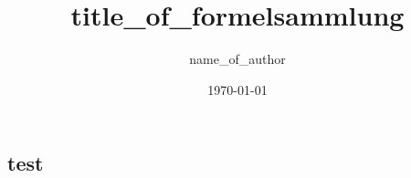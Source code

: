 

\newcommand{\FormelsammlungTitel}{title_of_formelsammlung}
\newcommand{\FormelsammlungAutor}{name_of_author}


	\title{\FormelsammlungTitel}
	\author{\FormelsammlungAutor}
	\date{\today}
	\begin{multicols}{3}
		\begin{minipage}{.4\paperheight}
			\maketitle
			\tableofcontents
		\end{minipage}
		\section{test}
	\end{multicols}

